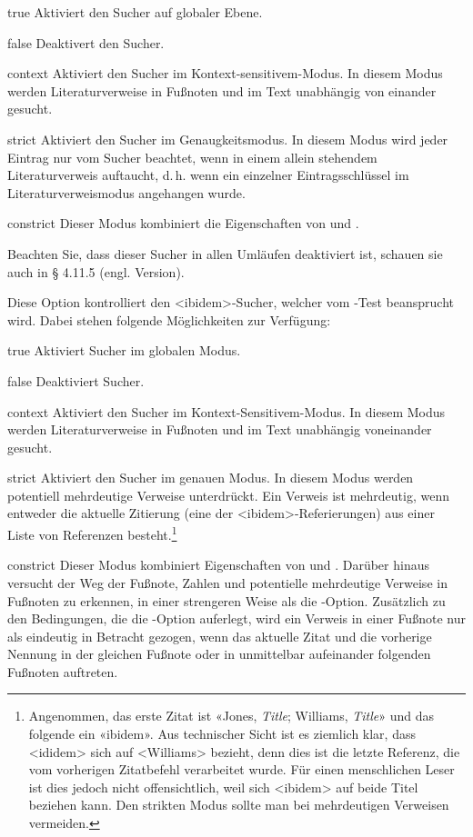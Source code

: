 \documentclass{ltxdockit}[2011/03/25]
\begin{document}
\begin{optionlist}
\begin{valuelist} 
\item[true] Aktiviert den Sucher auf globaler Ebene.
\item[false] Deaktivert den Sucher.  
\item[context] Aktiviert den Sucher im
Kontext-sensitivem-Modus. In diesem Modus werden Literaturverweise in Fußnoten
und im Text unabhängig von einander gesucht.  
\item[strict] Aktiviert den Sucher
im Genaugkeitsmodus. In diesem Modus wird jeder Eintrag nur vom Sucher beachtet,
wenn in einem allein stehendem Literaturverweis auftaucht, d.\,h. wenn ein
einzelner Eintragsschlüssel im Literaturverweismodus angehangen wurde.
\item[constrict] Dieser Modus kombiniert die Eigenschaften von  und
.  
\end{valuelist} 
Beachten Sie, dass dieser Sucher in allen
Umläufen deaktiviert ist, schauen sie auch in § 4.11.5 (engl. Version). %


Diese Option kontrolliert den <ibidem>-Sucher, welcher vom -Test
beansprucht wird. Dabei stehen folgende Möglichkeiten zur Verfügung:

\begin{valuelist} 
\item[true] Aktiviert Sucher im globalen Modus.  
\item[false] Deaktiviert Sucher.  
\item[context] Aktiviert den Sucher im
Kontext-Sensitivem-Modus. In diesem Modus werden Literaturverweise in Fußnoten
und im Text unabhängig voneinander gesucht. 
\item[strict] Aktiviert den Sucher
im genauen Modus. In diesem Modus werden potentiell mehrdeutige Verweise
unterdrückt. Ein Verweis ist mehrdeutig, wenn entweder die aktuelle Zitierung
(eine der <ibidem>-Referie\-rungen) aus einer Liste von Referenzen
besteht.\footnote{Angenommen, das erste Zitat ist «Jones, \emph{Title};
Williams, \emph{Title}» und das folgende ein «ibidem».  Aus technischer Sicht
ist es ziemlich klar, dass <ididem> sich auf <Williams> bezieht, denn dies ist
die letzte Referenz, die vom vorherigen Zitatbefehl verarbeitet wurde. Für einen
menschlichen Leser ist dies jedoch nicht offensichtlich, weil sich <ibidem> auf
beide Titel beziehen kann. Den strikten Modus sollte man bei mehrdeutigen
Verweisen vermeiden.} 
\item[constrict] Dieser Modus kombiniert Eigenschaften von
 und . Darüber hinaus versucht der Weg der
Fußnote,
Zahlen und potentielle mehrdeutige Verweise in Fußnoten zu erkennen, in einer
strengeren Weise als die -Option. Zusätzlich zu den Bedingungen, die
die -Option auferlegt, wird ein Verweis in einer Fußnote nur als
eindeutig in Betracht gezogen, wenn das aktuelle Zitat und die vorherige Nennung in
der gleichen Fußnote oder in unmittelbar aufeinander folgenden Fußnoten
auftreten.  
\end{valuelist}
%


\end{optionlist}
\end{document}
